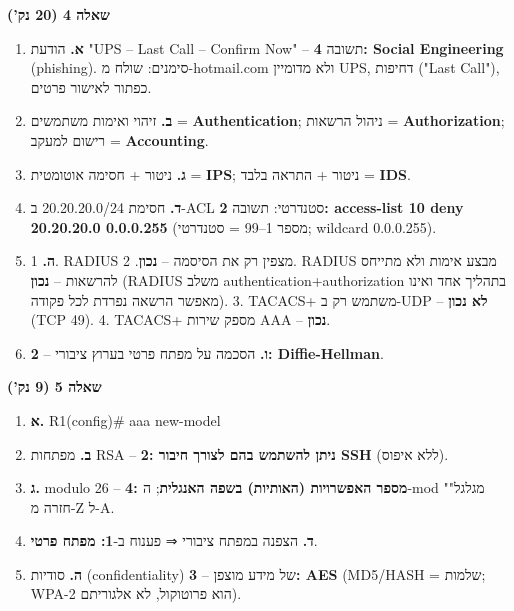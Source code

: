 \documentclass[11pt]{article}
\newcommand{\enLR}[1]{\textenglish{#1}}
\newcommand{\code}[1]{\textenglish{\codefont #1}}
\newcommand{\subheading}[1]{\vskip6pt{\bfseries\color{h3}#1\par}\vskip2pt}
\begin{document}
\subheading{שאלה \enLR{4 (20} נק')}

\begin{enumerate}
\item \textbf{א.} הודעת "\enLR{UPS} – \enLR{Last Call} – \enLR{Confirm Now"} – תשובה \textbf{\enLR{4: Social Engineering}} \enLR{(phishing).} סימנים: שולח מ-\enLR{hotmail.com} ולא מדומיין \enLR{UPS}, דחיפות ("\enLR{Last Call")}, כפתור לאישור פרטים.
\item \textbf{ב.} זיהוי ואימות משתמשים = \textbf{\enLR{Authentication}}; ניהול הרשאות = \textbf{\enLR{Authorization}}; רישום למעקב = \textbf{\enLR{Accounting}}.
\item \textbf{ג.} ניטור + חסימה אוטומטית = \textbf{\enLR{IPS}}; ניטור + התראה בלבד = \textbf{\enLR{IDS}}.
\item \textbf{ד.} חסימת \enLR{20.20.20.0/24} ב-\enLR{ACL} סטנדרטי: תשובה \textbf{\enLR{2}: \code{access-list 10 deny 20.20.20.0 0.0.0.255}} (מספר \enLR{1}–\enLR{99} = סטנדרטי; \enLR{wildcard 0.0.0.255).}
\item \textbf{ה.} \enLR{1. RADIUS} מצפין רק את הסיסמה – \textbf{נכון}. \enLR{2. RADIUS} מבצע אימות ולא מתייחס להרשאות – \textbf{נכון} \enLR{(RADIUS} משלב \enLR{authentication+authorization} בתהליך אחד ואינו מאפשר הרשאה נפרדת לכל פקודה). \enLR{3. TACACS}+ משתמש רק ב-\enLR{UDP} – \textbf{לא נכון} \enLR{(TCP 49). 4. TACACS}+ מספק שירות \enLR{AAA} – \textbf{נכון}.
\item \textbf{ו.} הסכמה על מפתח פרטי בערוץ ציבורי – \textbf{\enLR{2: Diffie-Hellman}}.
\end{enumerate}

\subheading{שאלה \enLR{5 (9} נק')}

\begin{enumerate}
\item \textbf{א.} \code{R1(config)\# aaa new-model}
\item \textbf{ב.} מפתחות \enLR{RSA} – \textbf{\enLR{2}: ניתן להשתמש בהם לצורך חיבור \enLR{SSH}} (ללא איפוס).
\item \textbf{ג.} \enLR{modulo 26} – \textbf{\enLR{4}: מספר האפשרויות (האותיות) בשפה האנגלית}; ה-\enLR{mod "}מגלגל" חזרה מ-\enLR{Z} ל-\enLR{A.}
\item \textbf{ד.} הצפנה במפתח ציבורי ⇒ פענוח ב-\textbf{\enLR{1}: מפתח פרטי}.
\item \textbf{ה.} סודיות \enLR{(confidentiality)} של מידע מוצפן – \textbf{\enLR{3: AES}} \enLR{(MD5/HASH} = שלמות; \enLR{WPA-2} הוא פרוטוקול, לא אלגוריתם).
\end{enumerate}
\end{document}
